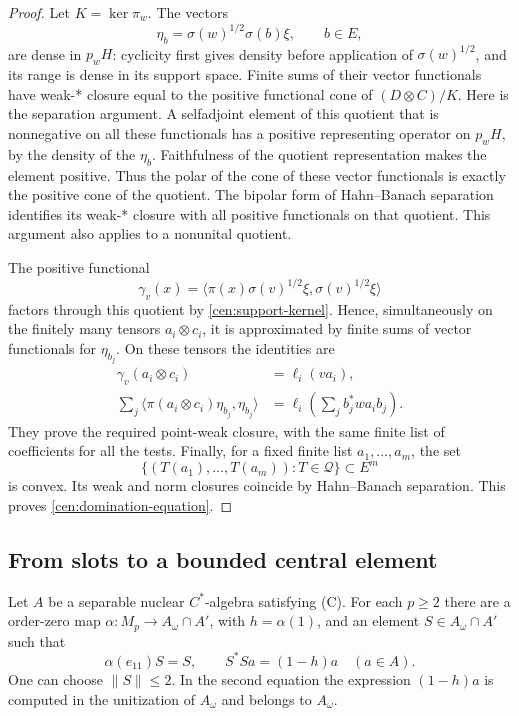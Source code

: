 \begin{proof}
Let $K=\ker\pi_w$.  The vectors
\[
 \eta_b=\sigma(w)^{1/2}\sigma(b)\xi,\qquad b\in E,
\]
are dense in $p_wH$: cyclicity first gives density before application
of $\sigma(w)^{1/2}$, and its range is dense in its support space.
Finite sums of their vector functionals have weak-* closure equal to
the positive functional cone of $(D\otimes C)/K$.  Here is the
separation argument.  A selfadjoint element of this quotient that is
nonnegative on all these functionals has a positive representing
operator on $p_wH$, by the density of the $\eta_b$.  Faithfulness of
the quotient representation makes the element positive.  Thus the
polar of the cone of these vector functionals is exactly the positive
cone of the quotient.  The bipolar form of Hahn--Banach separation
identifies its weak-* closure with all positive functionals on that
quotient.  This argument also applies to a nonunital quotient.

The positive functional
\[
 \gamma_v(x)=
 \langle\pi(x)\sigma(v)^{1/2}\xi,
                   \sigma(v)^{1/2}\xi\rangle
\]
factors through this quotient by \eqref{cen:support-kernel}.  Hence,
simultaneously on the finitely many tensors $a_i\otimes c_i$, it is
approximated by finite sums of vector functionals for $\eta_{b_j}$.
On these tensors the identities are
\begin{align*}
 \gamma_v(a_i\otimes c_i)&=\ell_i(va_i),\\
 \sum_j\langle\pi(a_i\otimes c_i)\eta_{b_j},\eta_{b_j}\rangle
   &=\ell_i\left(\sum_jb_j^*wa_i b_j\right).
\end{align*}
They prove the required point-weak closure, with the same finite list
of coefficients for all the tests.  Finally, for a fixed finite list
$a_1,\ldots,a_m$, the set
\[
 \{(T(a_1),\ldots,T(a_m)):T\in\mathcal Q\}\subset E^m
\]
is convex.  Its weak and norm closures coincide by Hahn--Banach
separation.  This proves \eqref{cen:domination-equation}.
\end{proof}

\subsection{From slots to a bounded central element}

\begin{proposition}\label{prop:central-filler}
Let $A$ be a separable nuclear $C^*$-algebra satisfying
\textup{(C)}.
For each $p\ge2$ there are a \cpc order-zero map
$\alpha:M_p\to A_\omega\cap A'$, with $h=\alpha(1)$, and an element
$S\in A_\omega\cap A'$ such that
\begin{equation}\label{cen:filler-relations}
 \alpha(e_{11})S=S,\qquad S^*S a=(1-h)a\quad(a\in A).
\end{equation}
One can choose $\|S\|\le2$.  In the second equation the expression
$(1-h)a$ is computed in the unitization of $A_\omega$ and belongs to
$A_\omega$.
\end{proposition}


